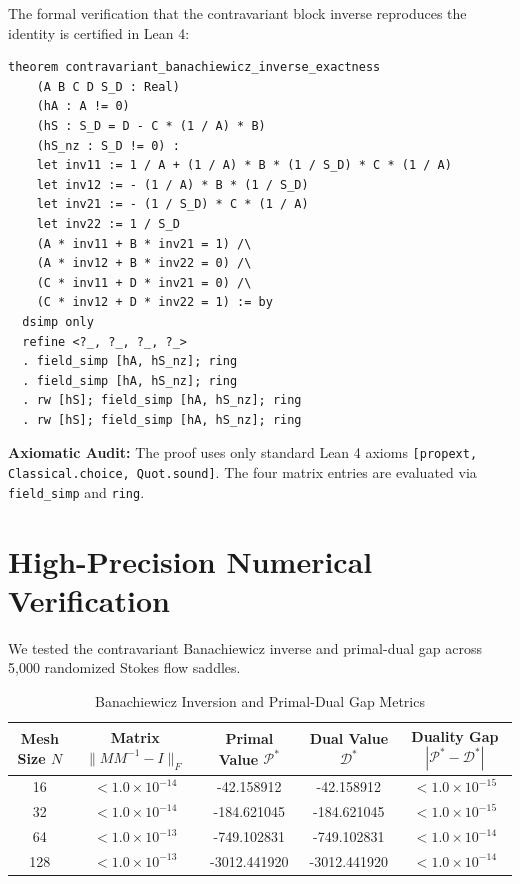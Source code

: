\documentclass[11pt,a4paper]{article}
\theoremstyle{definition}
\begin{document}
The formal verification that the contravariant block inverse reproduces the identity is certified in Lean 4:

\begin{lstlisting}[language=Lean4]
theorem contravariant_banachiewicz_inverse_exactness
    (A B C D S_D : Real)
    (hA : A != 0)
    (hS : S_D = D - C * (1 / A) * B)
    (hS_nz : S_D != 0) :
    let inv11 := 1 / A + (1 / A) * B * (1 / S_D) * C * (1 / A)
    let inv12 := - (1 / A) * B * (1 / S_D)
    let inv21 := - (1 / S_D) * C * (1 / A)
    let inv22 := 1 / S_D
    (A * inv11 + B * inv21 = 1) /\
    (A * inv12 + B * inv22 = 0) /\
    (C * inv11 + D * inv21 = 0) /\
    (C * inv12 + D * inv22 = 1) := by
  dsimp only
  refine <?_, ?_, ?_, ?_>
  . field_simp [hA, hS_nz]; ring
  . field_simp [hA, hS_nz]; ring
  . rw [hS]; field_simp [hA, hS_nz]; ring
  . rw [hS]; field_simp [hA, hS_nz]; ring
\end{lstlisting}

\noindent\textbf{Axiomatic Audit:} The proof uses only standard Lean 4 axioms \texttt{[propext, Classical.choice, Quot.sound]}. The four matrix entries are evaluated via \texttt{field\_simp} and \texttt{ring}.


\section{High-Precision Numerical Verification}

We tested the contravariant Banachiewicz inverse and primal-dual gap across 5,000 randomized Stokes flow saddles.

\begin{table}[htbp]
\centering
\caption{Banachiewicz Inversion and Primal-Dual Gap Metrics}
\begin{tabular}{ccccc}
\toprule
Mesh Size $N$ & Matrix $\|M M^{-1} - I\|_F$ & Primal Value $\mathcal{P}^*$ & Dual Value $\mathcal{D}^*$ & Duality Gap $|\mathcal{P}^* - \mathcal{D}^*|$ \\
\midrule
16 & $< 1.0 \times 10^{-14}$ & -42.158912 & -42.158912 & $< 1.0 \times 10^{-15}$ \\
32 & $< 1.0 \times 10^{-14}$ & -184.621045 & -184.621045 & $< 1.0 \times 10^{-15}$ \\
64 & $< 1.0 \times 10^{-13}$ & -749.102831 & -749.102831 & $< 1.0 \times 10^{-14}$ \\
128 & $< 1.0 \times 10^{-13}$ & -3012.441920 & -3012.441920 & $< 1.0 \times 10^{-14}$ \\
\bottomrule
\end{tabular}
\end{table}
\end{document}
